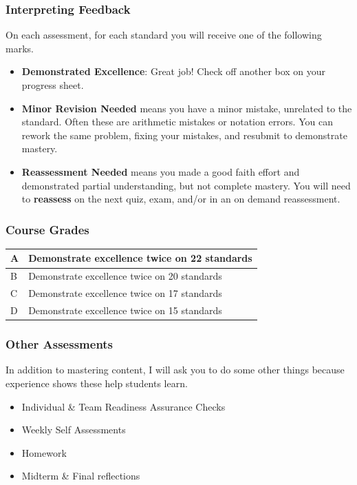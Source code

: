 \documentclass[aspectration=1610]{beamer}
\begin{document}
\begin{frame}\frametitle{Interpreting Feedback}
On each assessment, for each standard you will receive one of the following marks.
\begin{itemize}
\item {\bf Demonstrated Excellence}: Great job!  Check off another box on your progress sheet.
\item {\bf Minor Revision Needed} means you have a minor mistake, unrelated to the standard. Often these are arithmetic mistakes or notation errors. You can rework the same problem, fixing your mistakes, and resubmit to demonstrate mastery.
\item {\bf Reassessment Needed} means you made a good faith effort and demonstrated
      partial understanding, but not complete mastery. You will need to \textbf{reassess} on the next quiz, exam, and/or in an on demand reassessment.
\end{itemize}

\vspace{0.2in}

\end{frame}




\begin{frame}\frametitle{Course Grades}

\begin{center}
\begin{tabular}{ll} \hline
A & Demonstrate excellence twice on 22 standards\\ \hline
B & Demonstrate excellence twice on 20 standards\\ \hline
C & Demonstrate excellence twice on 17 standards\\ \hline
D & Demonstrate excellence twice on 15 standards\\ \hline
\end{tabular}
\end{center}

\end{frame}


\begin{frame}\frametitle{Other Assessments}
In addition to mastering content, I will ask you to do some other things because experience shows these help students learn.
\begin{itemize}
\item Individual \& Team Readiness Assurance Checks
\item Weekly Self Assessments
\item Homework
\item Midterm \& Final reflections
\end{itemize}
\end{frame}
\end{document}
